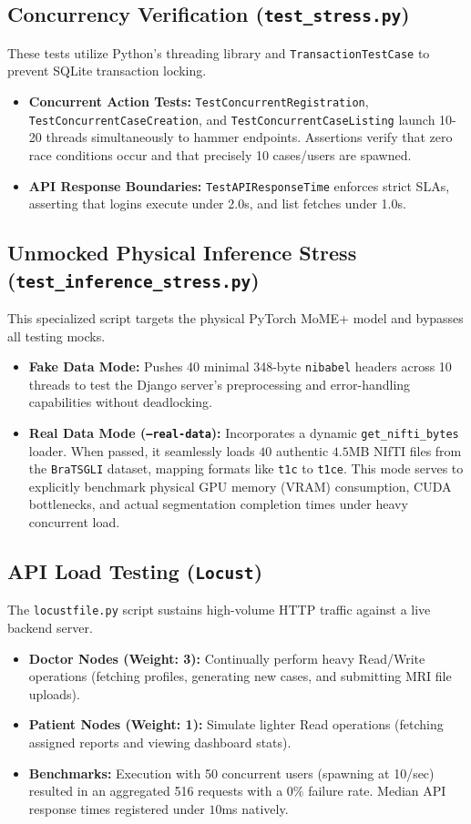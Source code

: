 \documentclass[11pt, a4paper]{article}
\begin{document}
\subsection{Concurrency Verification (\texttt{test\_stress.py})}
These tests utilize Python's threading library and \texttt{TransactionTestCase} to prevent SQLite transaction locking.
\begin{itemize}
    \item \textbf{Concurrent Action Tests:} \texttt{TestConcurrentRegistration}, \texttt{TestConcurrentCaseCreation}, and \texttt{TestConcurrentCaseListing} launch 10-20 threads simultaneously to hammer endpoints. Assertions verify that zero race conditions occur and that precisely 10 cases/users are spawned.
    \item \textbf{API Response Boundaries:} \texttt{TestAPIResponseTime} enforces strict SLAs, asserting that logins execute under 2.0s, and list fetches under 1.0s.
\end{itemize}

\subsection{Unmocked Physical Inference Stress (\texttt{test\_inference\_stress.py})}
This specialized script targets the physical PyTorch MoME+ model and bypasses all testing mocks.
\begin{itemize}
    \item \textbf{Fake Data Mode:} Pushes 40 minimal 348-byte \texttt{nibabel} headers across 10 threads to test the Django server's preprocessing and error-handling capabilities without deadlocking.
    \item \textbf{Real Data Mode (\texttt{--real-data}):} Incorporates a dynamic \texttt{get\_nifti\_bytes} loader. When passed, it seamlessly loads $40$ authentic $4.5$MB NIfTI files from the \texttt{BraTSGLI} dataset, mapping formats like \texttt{t1c} to \texttt{t1ce}. This mode serves to explicitly benchmark physical GPU memory (VRAM) consumption, CUDA bottlenecks, and actual segmentation completion times under heavy concurrent load.
\end{itemize}

\subsection{API Load Testing (\texttt{Locust})}
The \texttt{locustfile.py} script sustains high-volume HTTP traffic against a live backend server. 
\begin{itemize}
    \item \textbf{Doctor Nodes (Weight: 3):} Continually perform heavy Read/Write operations (fetching profiles, generating new cases, and submitting MRI file uploads).
    \item \textbf{Patient Nodes (Weight: 1):} Simulate lighter Read operations (fetching assigned reports and viewing dashboard stats).
    \item \textbf{Benchmarks:} Execution with 50 concurrent users (spawning at 10/sec) resulted in an aggregated 516 requests with a $0\%$ failure rate. Median API response times registered under $10$ms natively.
\end{itemize}
\end{document}
